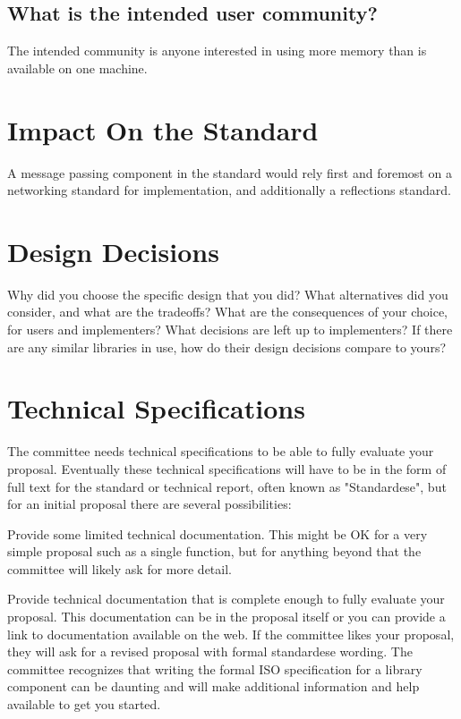 \documentclass{isocpp_proposal}
\begin{document}
\subsection{ What is the intended user community?}
The intended community is anyone interested in using more memory than is available on one machine.

\section{Impact On the Standard}
A message passing component in the standard would rely first and foremost on a networking standard for implementation, and additionally a reflections standard.

\section{Design Decisions}

Why did you choose the specific design that you did? What alternatives did you consider, and what are the tradeoffs? What are the consequences of your choice, for users and implementers? What decisions are left up to implementers? If there are any similar libraries in use, how do their design decisions compare to yours?

\section{Technical Specifications}

The committee needs technical specifications to be able to fully evaluate your proposal. Eventually these technical specifications will have to be in the form of full text for the standard or technical report, often known as "Standardese", but for an initial proposal there are several possibilities:

Provide some limited technical documentation. This might be OK for a very simple proposal such as a single function, but for anything beyond that the committee will likely ask for more detail. 
 
Provide technical documentation that is complete enough to fully evaluate your proposal. This documentation can be in the proposal itself or you can provide a link to documentation available on the web. If the committee likes your proposal, they will ask for a revised proposal with formal standardese wording. The committee recognizes that writing the formal ISO specification for a library component can be daunting and will make additional information and help available to get you started.
 
\end{document}
